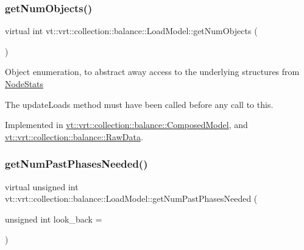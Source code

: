 \subsubsection{\texorpdfstring{get\+Num\+Objects()}{getNumObjects()}}
{\footnotesize\ttfamily virtual int vt\+::vrt\+::collection\+::balance\+::\+Load\+Model\+::get\+Num\+Objects (\begin{DoxyParamCaption}{ }\end{DoxyParamCaption})\hspace{0.3cm}{\ttfamily [pure virtual]}}

Object enumeration, to abstract away access to the underlying structures from \hyperlink{structvt_1_1vrt_1_1collection_1_1balance_1_1_node_stats}{Node\+Stats}

The {\ttfamily update\+Loads} method must have been called before any call to this. 

Implemented in \hyperlink{classvt_1_1vrt_1_1collection_1_1balance_1_1_composed_model_a7b383954706cb8069e841a87c3ff3f8f}{vt\+::vrt\+::collection\+::balance\+::\+Composed\+Model}, and \hyperlink{structvt_1_1vrt_1_1collection_1_1balance_1_1_raw_data_a586c3223d1f69ee9d5eb2930ff659051}{vt\+::vrt\+::collection\+::balance\+::\+Raw\+Data}.

\mbox{\label{classvt_1_1vrt_1_1collection_1_1balance_1_1_load_model_ac061725720a2017908090863080b70e5}} 
\subsubsection{\texorpdfstring{get\+Num\+Past\+Phases\+Needed()}{getNumPastPhasesNeeded()}}
{\footnotesize\ttfamily virtual unsigned int vt\+::vrt\+::collection\+::balance\+::\+Load\+Model\+::get\+Num\+Past\+Phases\+Needed (\begin{DoxyParamCaption}\item[{unsigned int}]{look\+\_\+back = {} }\end{DoxyParamCaption})\hspace{0.3cm}{\ttfamily [pure virtual]}}



